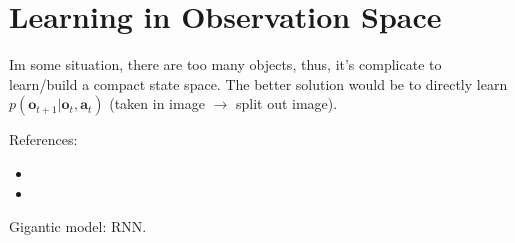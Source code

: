 \section{Learning in Observation Space}
Im some situation, there are too many objects, thus, it's complicate to learn/build a compact state space. The better solution would be to directly learn $p(\textbf{o}_{t+1} | \textbf{o}_t, \textbf{a}_t)$ (taken in image $\rightarrow$ split out image).

References:
\begin{itemize}
	\item {}
	\item {}
\end{itemize}

Gigantic model: \ac{RNN}. 